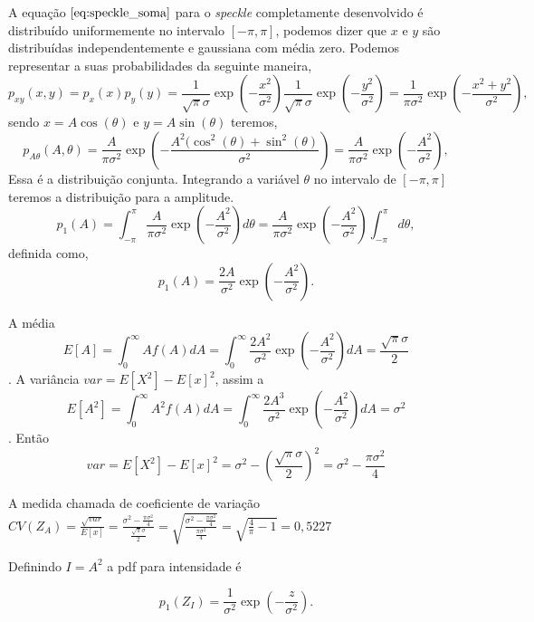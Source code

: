 A equação $\eqref{eq:speckle_soma}$ para o \textit{speckle} completamente desenvolvido é distribuído uniformemente no intervalo $[-\pi,\pi]$, podemos dizer que $x$ e $y$ são distribuídas independentemente e gaussiana com média zero. Podemos representar a suas probabilidades da seguinte maneira,
\begin{equation}\label{eq:pdf_gaussiana_xy}
p_{xy}(x,y)=p_x(x)p_y(y)=\frac{1}{\sqrt{\pi}\sigma}\exp\left(-\frac{x^2}{\sigma^2}\right)\frac{1}{\sqrt{\pi}\sigma}\exp\left(-\frac{y^2}{\sigma^2}\right)=\frac{1}{\pi\sigma^2}\exp\left(-\frac{x^2+y^2}{\sigma^2}\right),
\end{equation}
sendo $x=A\cos(\theta)$ e $y=A\sin(\theta)$ teremos,
\begin{equation}\label{eq:pdf_gaussiana_Atheta}
p_{A\theta}(A,\theta)=\frac{A}{\pi\sigma^2}\exp\left(-\frac{A^2(\cos^2(\theta)+\sin^2(\theta)}{\sigma^2}\right)=\frac{A}{\pi\sigma^2}\exp\left(-\frac{A^2}{\sigma^2}\right),
\end{equation}
Essa é a distribuição conjunta. Integrando a variável $\theta$ no intervalo de $[-\pi,\pi]$ teremos a distribuição para a amplitude.
\begin{equation}\nonumber
p_1(A)=\int_{-\pi}^{\pi}\frac{A}{\pi\sigma^2}\exp\left(-\frac{A^2}{\sigma^2}\right)d\theta=\frac{A}{\pi\sigma^2}\exp\left(-\frac{A^2}{\sigma^2}\right)\int_{-\pi}^{\pi}d\theta,
\end{equation}
definida como,
\begin{equation}\nonumber
p_1(A)=\frac{2A}{\sigma^2}\exp\left(-\frac{A^2}{\sigma^2}\right).
\end{equation}

A média $$E[A]=\int_0^\infty Af(A)dA=\int_0^	\infty \frac{2A^2}{\sigma^2}\exp\left(-\frac{A^2}{\sigma^2}\right) dA=\frac{\sqrt{\pi}\sigma}{2}$$. A variância $var= E[X^2]-E[x]^2$, assim a $$E[A^2]=\int_0^\infty A^2f(A)dA=\int_0^	\infty \frac{2A^3}{\sigma^2}\exp\left(-\frac{A^2}{\sigma^2}\right) dA=\sigma^2$$.
Então $$var=E[X^2]-E[x]^2=\sigma^2-\left(\frac{\sqrt{\pi}\sigma}{2}\right)^2=\sigma^2-\frac{\pi\sigma^2}{4}$$

A medida chamada de coeficiente de variação $CV(Z_A) =\frac{\sqrt{var}}{E[x]}=\frac{\sigma^2-\frac{\pi\sigma^2}{4}}{\frac{\sqrt{\pi}\sigma}{2}}=\sqrt{\frac{\sigma^2-\frac{\pi\sigma^2}{4}}{\frac{\pi\sigma^2}{4}}}=\sqrt{\frac{4}{\pi}-1}=0,5227$

Definindo $I=A^2$ a pdf para intensidade é 

\begin{equation}\nonumber
p_1(Z_I)=\frac{1}{\sigma^2}\exp\left(-\frac{z}{\sigma^2}\right).
\end{equation}

